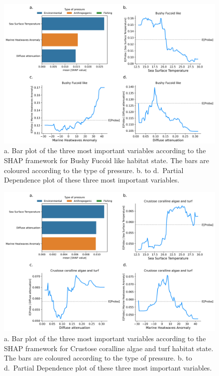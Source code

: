 \begin{figure}
\hypertarget{fig:chap3figS39}{%
\centering
\includegraphics{03-Chapitre3/figures/supplementary/04-pdp_Bushy Fucoid like.png}
\caption{a. Bar plot of the three most important variables according to
the SHAP framework for Bushy Fucoid like habitat state. The bars are
coloured according to the type of pressure. b. to d.~Partial Dependence
plot of these three most important variables.}\label{fig:chap3figS39}
}
\end{figure}

\begin{figure}
\hypertarget{fig:chap3figS40}{%
\centering
\includegraphics{03-Chapitre3/figures/supplementary/04-pdp_Crustose coralline algae and turf.png}
\caption{a. Bar plot of the three most important variables according to
the SHAP framework for Crustose coralline algae and turf habitat state.
The bars are coloured according to the type of pressure. b. to
d.~Partial Dependence plot of these three most important
variables.}\label{fig:chap3figS40}
}
\end{figure}


